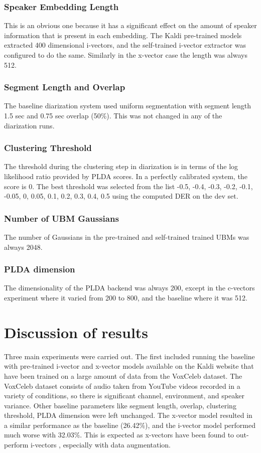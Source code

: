 		\subsubsection{Speaker Embedding Length}
			This is an obvious one because it has a significant effect on the amount of speaker information that is present in each embedding. The Kaldi pre-trained models extracted 400 dimensional i-vectors, and the self-trained i-vector extractor was configured to do the same. Similarly in the x-vector case the length was always 512.
		\subsubsection{Segment Length and Overlap}
		The baseline diarization system used uniform segmentation with segment length 1.5 sec and 0.75 sec overlap (50\%). This was not changed in any of the diarization runs.
		\subsubsection{Clustering Threshold}
		The threshold during the clustering step in diarization is in terms of the log likelihood ratio provided by PLDA scores. In a perfectly calibrated system, the score is 0. The best threshold was selected from the list -0.5, -0.4, -0.3, -0.2, -0.1, -0.05, 0, 0.05, 0.1, 0.2, 0.3, 0.4, 0.5 using the computed DER on the dev set.
		\subsubsection{Number of UBM Gaussians}
		The number of Gaussians in the pre-trained and self-trained trained UBMs was always 2048.
		\subsubsection{PLDA dimension}
		The dimensionality of the PLDA backend was always 200, except in the c-vectors experiment where it varied from 200 to 800, and the baseline where it was 512.

	\section{Discussion of results}
		Three main experiments were carried out. The first included running the baseline with pre-trained i-vector and x-vector models available on the Kaldi website that have been trained on a large amount of data from the VoxCeleb dataset. The VoxCeleb dataset consists of audio taken from YouTube videos recorded in a variety of conditions, so there is significant channel, environment, and speaker variance. Other baseline parameters like segment length, overlap, clustering threshold, PLDA dimension were left unchanged. The x-vector model resulted in a similar performance as the baseline (26.42\%), and the i-vector model performed much worse with 32.03\%. This is expected as x-vectors have been found to out-perform i-vectors \cite{snyder2018x}, especially with data augmentation.
		
